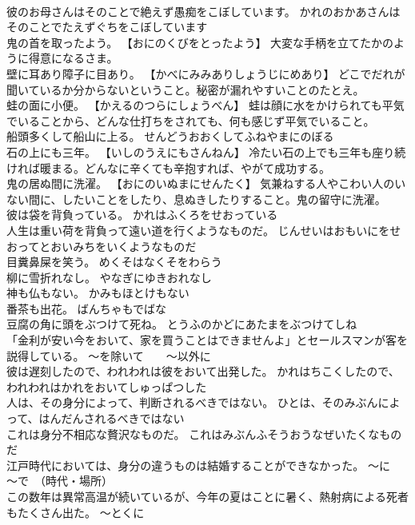 \documentclass[8pt]{extreport}
\begin{document}
\begin{CJK}{UTF8}{min}
\\	彼のお母さんはそのことで絶えず愚痴をこぼしています。	かれのおかあさんはそのことでたえずぐちをこぼしています 
\\	鬼の首を取ったよう。	【おにのくびをとったよう】 大変な手柄を立てたかのように得意になるさま。
\\	壁に耳あり障子に目あり。	【かべにみみありしょうじにめあり】 どこでだれが聞いているか分からないということ。秘密が漏れやすいことのたとえ。
\\	蛙の面に小便。	【かえるのつらにしょうべん】 蛙は顔に水をかけられても平気でいることから、どんな仕打ちをされても、何も感じず平気でいること。
\\	船頭多くして船山に上る。	せんどうおおくしてふねやまにのぼる 
\\	石の上にも三年。	【いしのうえにもさんねん】 冷たい石の上でも三年も座り続ければ暖まる。どんなに辛くても辛抱すれば、やがて成功する。
\\	鬼の居ぬ間に洗濯。	【おにのいぬまにせんたく】 気兼ねする人やこわい人のいない間に、したいことをしたり、息ぬきしたりすること。鬼の留守に洗濯。
\\	彼は袋を背負っている。	かれはふくろをせおっている 
\\	人生は重い荷を背負って遠い道を行くようなものだ。	じんせいはおもいにをせおってとおいみちをいくようなものだ 
\\	目糞鼻屎を笑う。	めくそはなくそをわらう 
\\	柳に雪折れなし。	やなぎにゆきおれなし 
\\	神も仏もない。	かみもほとけもない 
\\	番茶も出花。	ばんちゃもでばな 
\\	豆腐の角に頭をぶつけて死ね。	とうふのかどにあたまをぶつけてしね 
\\	「金利が安い今をおいて、家を買うことはできませんよ」とセールスマンが客を説得している。	～を除いて　　～以外に
\\	彼は遅刻したので、われわれは彼をおいて出発した。	かれはちこくしたので、われわれはかれをおいてしゅっぱつした 
\\	人は、その身分によって、判断されるべきではない。	ひとは、そのみぶんによって、はんだんされるべきではない 
\\	これは身分不相応な贅沢なものだ。	これはみぶんふそうおうなぜいたくなものだ 
\\	江戸時代においては、身分の違うものは結婚することができなかった。	～に　　～で　（時代・場所）
\\	この数年は異常高温が続いているが、今年の夏はことに暑く、熱射病による死者もたくさん出た。	～とくに

\end{CJK}
\end{document}
